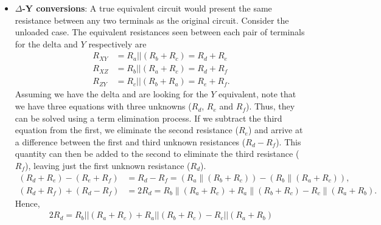 \documentclass{report}
\begin{document}
\begin{itemize}
            \bigbreak \noindent 
            \bigbreak \noindent 
            Alternately, if they are slightly redrawn they are known as pi networks and $T$ networks
            \bigbreak \noindent 
            \bigbreak \noindent 
            It is possible to convert back and forth between delta and $Y$ networks. That is, for every delta network, there exists a $Y$ network such that the resistances seen between the $X$, $Y$ and $Z$ terminals are identical, and vice versa. Consequently, one configuration can replace another in order to simplify a larger circuit.
        \item \textbf{$\Delta$-Y conversions}: A true equivalent circuit would present the same resistance between any two terminals as the original circuit. Consider the unloaded case. The equivalent resistances seen between each pair of terminals for the delta and $Y$ respectively are
            \begin{align*}
                R_{XY} &= R_{a} || (R_{b} + R_{c}) = R_{d} + R_{e} \\
                R_{XZ} &= R_{b} || (R_{a} + R_{c}) = R_{d} + R_{f} \\
                R_{ZY} &= R_{c} || (R_{b} + R_{a}) = R_{e} + R_{f} 
            .\end{align*}
            Assuming we have the delta and are looking for the $Y$ equivalent, note that we have three equations with three unknowns ($R_{d}$, $R_{e}$ and $R_{f}$). Thus, they can be solved using a term elimination process.
            \bigbreak \noindent 
            If we subtract the third equation from the first, we eliminate the second resistance ($R_{e}$) and arrive at a difference between the first and third unknown resistances ($R_{d} - R_{f}$). This quantity can then be added to the second to eliminate the third resistance ($R_{f}$), leaving just the first unknown resistance ($R_{d}$).
            \begin{align*}
                (R_d + R_e) - (R_e + R_f) &= R_d - R_f  = \left(R_a \parallel (R_b + R_c)\right) - \left(R_b \parallel (R_a + R_c)\right), \\[6pt]
                (R_d + R_f) + (R_d - R_f) &= 2R_d = R_b \parallel (R_a + R_c) + R_a \parallel (R_b + R_c) - R_c \parallel (R_a + R_b) 
            .\end{align*}
            Hence,
            \begin{align*}
                2R_{d} = R_{b} || (R_{a} + R_{c}) + R_{a} || (R_{b} + R_{c}) - R_{c} || (R_{a} + R_{b})

\end{align*}
\end{itemize}
\end{document}
